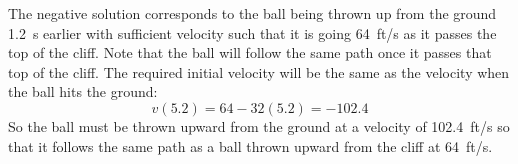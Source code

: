 \documentclass[letterpaper,12pt,fleqn]{article}
\begin{document}
\begin{enumerate}[left=0in]
  The negative solution corresponds to the ball being thrown up from the ground \SI{1.2}{s} earlier with sufficient
  velocity such that it is going \SI{64}{ft/s} as it passes the top of the cliff.  Note that the ball will follow the
  same path once it passes that top of the cliff.  The required initial velocity will be the same as the velocity when
  the ball hits the ground:
  \[v(5.2)=64-32(5.2)=-102.4\]
  So the ball must be thrown upward from the ground at a velocity of \SI{102.4}{ft/s} so that it follows the same
  path as a ball thrown upward from the cliff at \SI{64}{ft/s}.
\end{enumerate}
\end{document}
